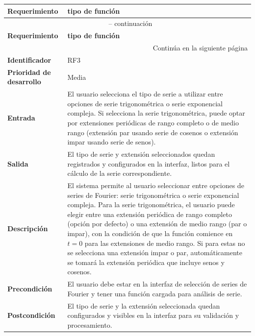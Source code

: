 \begin{longtable}{|m{3.5cm}|m{9.5cm}|}
	\hline
	\rowcolor{black!75} \color{white}\textbf{Requerimiento} & \color{white}\textbf{tipo de función} \\
	\hline
	\endfirsthead
	\multicolumn{2}{c}{{\tablename\ \thetable{} -- continuación}} \\
	\hline
	\rowcolor{black!75} \color{white}\textbf{Requerimiento} & \color{white}\textbf{tipo de función} \\
	\hline
	\endhead
	\hline \multicolumn{2}{r}{{Continúa en la siguiente página}} \\
	\endfoot
	\hline
	\endlastfoot
	
	\textbf{Identificador} & RF3 \\
	\hline
	\textbf{Prioridad de desarrollo} & Media \\
	\hline
	\textbf{Entrada} & El usuario selecciona el tipo de serie a utilizar entre opciones de serie trigonométrica o serie exponencial compleja. Si selecciona la serie trigonométrica, puede optar por extensiones periódicas de rango completo o de medio rango (extensión par usando serie de cosenos o extensión impar usando serie de senos). \\
	\hline
	\textbf{Salida} & El tipo de serie y extensión seleccionados quedan registrados y configurados en la interfaz, listos para el cálculo de la serie correspondiente. \\
	\hline
	\textbf{Descripción} & El sistema permite al usuario seleccionar entre opciones de series de Fourier: serie trigonométrica o serie exponencial compleja. Para la serie trigonométrica, el usuario puede elegir entre una extensión periódica de rango completo (opción por defecto) o una extensión de medio rango (par o impar), con la condición de que la función comience en \( t = 0 \) para las extensiones de medio rango. Si para estas no se selecciona una extensión impar o par, automáticamente se tomará la extensión periódica que incluye senos y cosenos. \\
	\hline
	\textbf{Precondición} & El usuario debe estar en la interfaz de selección de series de Fourier y tener una función cargada para análisis de serie. \\
	\hline
	\textbf{Postcondición} & El tipo de serie y la extensión seleccionada quedan configurados y visibles en la interfaz para su validación y procesamiento. \\
	\hline
\end{longtable}
\caption{Requerimiento funcional No. 3} \label{tabla:RF3}
\vspace{0.5cm}

